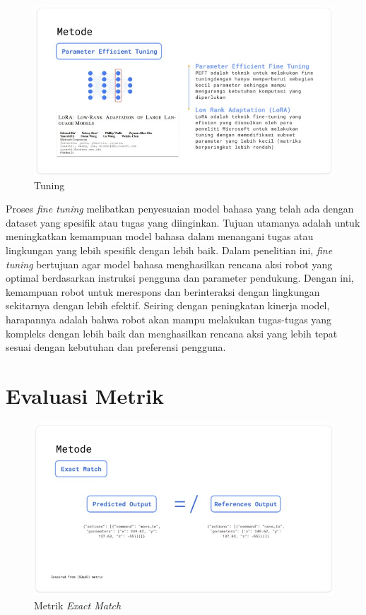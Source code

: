 \begin{figure} [H] \centering
  \includegraphics[scale=0.7]{gambar/lora_tun.jpg}
  \caption{Tuning}
\end{figure}

  Proses \textit{fine tuning} melibatkan penyesuaian model bahasa yang telah ada dengan dataset yang spesifik atau tugas yang diinginkan. Tujuan utamanya adalah untuk meningkatkan kemampuan model bahasa dalam menangani tugas atau lingkungan yang lebih spesifik dengan lebih baik. Dalam penelitian ini, \textit{fine tuning} bertujuan agar model bahasa menghasilkan rencana aksi robot yang optimal berdasarkan instruksi pengguna dan parameter pendukung. Dengan ini, kemampuan robot untuk merespons dan berinteraksi dengan lingkungan sekitarnya dengan lebih efektif. Seiring dengan peningkatan kinerja model, harapannya adalah bahwa robot akan mampu melakukan tugas-tugas yang kompleks dengan lebih baik dan menghasilkan rencana aksi yang lebih tepat sesuai dengan kebutuhan dan preferensi pengguna.


\section{Evaluasi Metrik}

\begin{figure} [H] \centering
  \includegraphics[scale=0.7]{gambar/exact.jpg}
  \caption{Metrik \textit{Exact Match}}
\end{figure}

